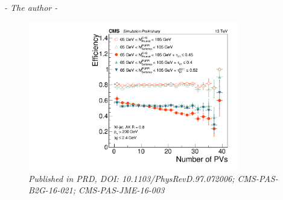 \begin{flushright} \textit{- The author - } \end{flushright}
\begin{figure}[h!]
    \centering
     \vspace*{10mm}
    \includegraphics[height=6.5cm]{figures/vtagging/JME-16-003/BoostedW/WtagSigEffvsNPV.pdf}
    \vspace*{10mm}
    \caption*{\footnotesize{\textit{Published in PRD, DOI: 10.1103/PhysRevD.97.072006; CMS-PAS-B2G-16-021; CMS-PAS-JME-16-003}}}
\end{figure}
\vspace*{\fill}

\clearpage


